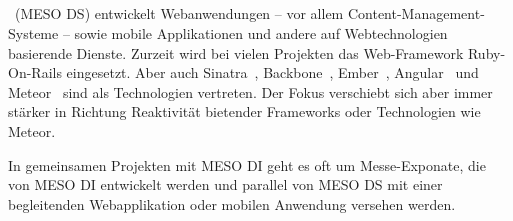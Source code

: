 \subsection{\mesods}
\label{ssec:em_meso_digital_services}

\mesods~(MESO DS) entwickelt Webanwendungen -- vor allem
Content-Management-Systeme -- sowie mobile Applikationen und andere auf
Webtechnologien basierende Dienste.  Zurzeit wird bei vielen Projekten das
Web-Framework Ruby-On-Rails eingesetzt.  Aber auch Sinatra~\cite{sinatra},
Backbone~\cite{backbone}, Ember~\cite{ember}, Angular~\cite{angular} und
Meteor~\cite{meteor} sind als Technologien vertreten.  Der Fokus verschiebt
sich aber immer stärker in Richtung Reaktivität bietender Frameworks oder
Technologien wie Meteor.

In gemeinsamen Projekten mit MESO DI geht es oft um Messe-Exponate, die von MESO
DI entwickelt werden und parallel von MESO DS mit einer begleitenden
Webapplikation oder mobilen Anwendung versehen werden.
